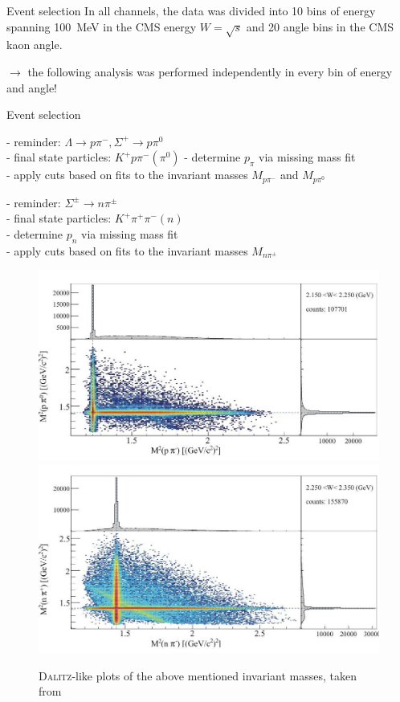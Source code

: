 \documentclass[11pt,aspectratio=1610,dvipsnames]{beamer}
\begin{document}
\begin{frame}{Event selection}
In all channels, the data was divided into 10 bins of energy spanning \SI{100}{\mega\eV} in the CMS energy $W=\sqrt{s}$ and 20 angle bins in the CMS kaon angle.

$\to$ the following analysis was performed independently in every bin of energy and angle!
\end{frame}
\begin{frame}{Event selection}
	\centering
	\begin{minipage}{.49\linewidth}
		\begin{tcolorbox}[colback=black!10,colframe=gray!20!black,title=extracting $\Lambda\pi^0$ and $\Sigma^+\pi^-$] 
		- reminder: $\Lambda\to p\pi^-, \Sigma^+\to p\pi^0$\\	
		- final state particles: $K^+p\pi^-(\pi^0)$ 
		- determine $p_\pi$ via missing mass fit\\
		- apply cuts based on fits to the invariant masses $M_{p\pi^-}$ and $M_{p\pi^0}$	
			
			
	\end{tcolorbox}	
\end{minipage}
\begin{minipage}{.49\linewidth}
	\begin{tcolorbox}[colback=black!10,colframe=gray!20!black,title=extracting $\Sigma^+\pi^-$ and $\Sigma^-\pi^+$] 
	- reminder: $\Sigma^\pm\to n\pi^\pm$\\
	- final state particles: $K^+\pi^+\pi^-(n)$\\
	- determine $p_n$ via missing mass fit\\
	- apply cuts based on fits to the invariant masses $M_{n\pi^\pm}$
	\end{tcolorbox}	
\end{minipage}
\begin{figure}[H]
	\centering
	\includegraphics[width=.49\linewidth]{inv_mass_1.jpg}
	\includegraphics[width=.49\linewidth]{inv_mass_2.jpg}
	\caption{\textsc{Dalitz}-like plots of the above mentioned invariant masses, taken from \citet{lineshapes}}
\end{figure}
\end{frame}
\end{document}
